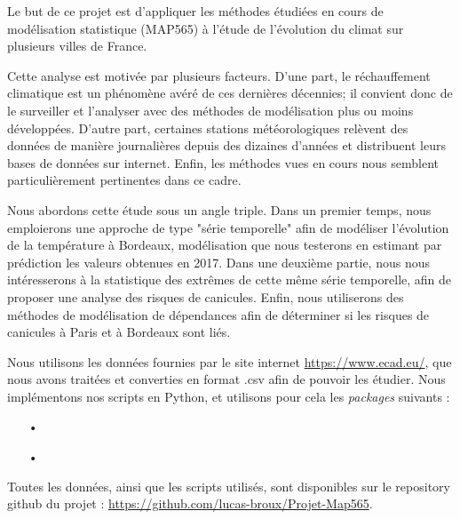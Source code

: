 \documentclass[../report.tex]{subfiles}
\begin{document}
\par Le but de ce projet est d'appliquer les méthodes étudiées en cours de modélisation statistique (MAP565) à l'étude de l'évolution du climat sur plusieurs villes de France.

\par Cette analyse est motivée par plusieurs facteurs. D'une part, le réchauffement climatique est un phénomène avéré de ces dernières décennies; il convient donc de le surveiller et l'analyser avec des méthodes de modélisation plus ou moins développées. D'autre part, certaines stations météorologiques relèvent des données de manière journalières depuis des dizaines d'années et distribuent leurs bases de données sur internet. Enfin, les méthodes vues en cours nous semblent particulièrement pertinentes dans ce cadre.

\par Nous abordons cette étude sous un angle triple.
Dans un premier temps, nous emploierons une approche de type "série temporelle" afin de modéliser l'évolution de la température à Bordeaux, modélisation que nous testerons en estimant par prédiction les valeurs obtenues en 2017.
Dans une deuxième partie, nous nous intéresserons à la statistique des extrêmes de cette même série temporelle, afin de proposer une analyse des risques de canicules.
Enfin, nous utiliserons des méthodes de modélisation de dépendances afin de déterminer si les risques de canicules à Paris et à Bordeaux sont liés.

\par Nous utilisons les données fournies par le site internet \url{https://www.ecad.eu/}, que nous avons traitées et converties en format .csv afin de pouvoir les étudier. 
Nous implémentons nos scripts en Python, et utilisons pour cela les \emph{packages} suivants : 
\begin{itemize}
\item[•]
\item[•]
\end{itemize}
Toutes les données, ainsi que les scripts utilisés, sont disponibles sur le repository github du projet : \url{https://github.com/lucas-broux/Projet-Map565}.
\end{document}
